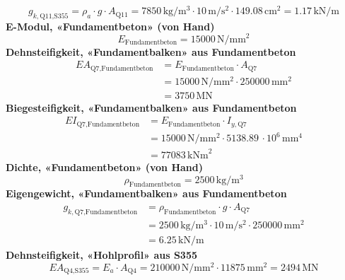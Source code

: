 \documentclass[11pt,a4paper]{article}
\begin{document}
\begin{equation*}
g_{k,\text{Q11,S355}} = \rho_a \cdot g \cdot A_{\text{Q11}} = 7850\,\mathrm{kg}/\mathrm{m}^{3} \cdot 10\,\mathrm{m}/\mathrm{s}^{2} \cdot 149.08\,\mathrm{cm}^{2} = 1.17\,\mathrm{kN}/\mathrm{m}
\end{equation*}
\noindent\textbf{E-Modul, «Fundamentbeton» (von Hand)}
\begin{equation*}
E_{\text{Fundamentbeton}} = 15000\,\mathrm{N}/\mathrm{mm}^{2}
\end{equation*}
\noindent\textbf{Dehnsteifigkeit, «Fundamentbalken» aus Fundamentbeton}
\begin{equation*}
\begin{aligned}
  EA_{\text{Q7,Fundamentbeton}} &= E_{\text{Fundamentbeton}} \cdot A_{\text{Q7}} \\
  &= 15000\,\mathrm{N}/\mathrm{mm}^{2} \cdot 250000\,\mathrm{mm}^{2} \\
  &= 3750\,\mathrm{MN}
\end{aligned}
\end{equation*}
\noindent\textbf{Biegesteifigkeit, «Fundamentbalken» aus Fundamentbeton}
\begin{equation*}
\begin{aligned}
  EI_{\text{Q7,Fundamentbeton}} &= E_{\text{Fundamentbeton}} \cdot I_{y,\text{Q7}} \\
  &= 15000\,\mathrm{N}/\mathrm{mm}^{2} \cdot 5138.89\,\cdot 10^{6}\,\mathrm{mm}^{4} \\
  &= 77083\,\mathrm{kNm}^{2}
\end{aligned}
\end{equation*}
\noindent\textbf{Dichte, «Fundamentbeton» (von Hand)}
\begin{equation*}
\rho_{\text{Fundamentbeton}} = 2500\,\mathrm{kg}/\mathrm{m}^{3}
\end{equation*}
\noindent\textbf{Eigengewicht, «Fundamentbalken» aus Fundamentbeton}
\begin{equation*}
\begin{aligned}
  g_{k,\text{Q7,Fundamentbeton}} &= \rho_{\text{Fundamentbeton}} \cdot g \cdot A_{\text{Q7}} \\
  &= 2500\,\mathrm{kg}/\mathrm{m}^{3} \cdot 10\,\mathrm{m}/\mathrm{s}^{2} \cdot 250000\,\mathrm{mm}^{2} \\
  &= 6.25\,\mathrm{kN}/\mathrm{m}
\end{aligned}
\end{equation*}
\noindent\textbf{Dehnsteifigkeit, «Hohlprofil» aus S355}
\begin{equation*}
EA_{\text{Q4,S355}} = E_a \cdot A_{\text{Q4}} = 210000\,\mathrm{N}/\mathrm{mm}^{2} \cdot 11875\,\mathrm{mm}^{2} = 2494\,\mathrm{MN}
\end{equation*}
\end{document}
